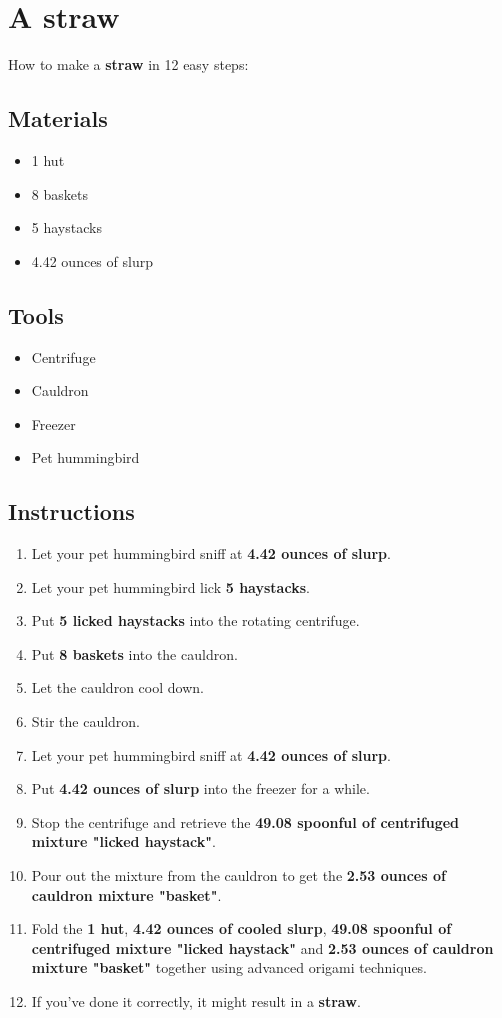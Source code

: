 \documentclass{article}
\begin{document}
\section{A straw}How to make a \textbf{straw} in 12 easy steps:

\subsection{Materials}\begin{itemize}
\item 
1 hut
\item 
8 baskets
\item 
5 haystacks
\item 
4.42 ounces of slurp
\end{itemize}
\subsection{Tools}\begin{itemize}
\item 
Centrifuge
\item 
Cauldron
\item 
Freezer
\item 
Pet hummingbird
\end{itemize}
\subsection{Instructions}\begin{enumerate}
\item 
Let your pet hummingbird sniff at \textbf{4.42 ounces of slurp}.
\item 
Let your pet hummingbird lick \textbf{5 haystacks}.
\item 
Put \textbf{5 licked haystacks} into the rotating centrifuge.
\item 
Put \textbf{8 baskets} into the cauldron.
\item 
Let the cauldron cool down.
\item 
Stir the cauldron.
\item 
Let your pet hummingbird sniff at \textbf{4.42 ounces of slurp}.
\item 
Put \textbf{4.42 ounces of slurp} into the freezer for a while.
\item 
Stop the centrifuge and retrieve the \textbf{49.08 spoonful of centrifuged mixture "licked haystack"}.
\item 
Pour out the mixture from the cauldron to get the \textbf{2.53 ounces of cauldron mixture "basket"}.
\item 
Fold the \textbf{1 hut}, \textbf{4.42 ounces of cooled slurp}, \textbf{49.08 spoonful of centrifuged mixture "licked haystack"} and \textbf{2.53 ounces of cauldron mixture "basket"} together using advanced origami techniques.
\item 
If you've done it correctly, it might result in a \textbf{straw}.
\end{enumerate}
\newpage
\end{document}
